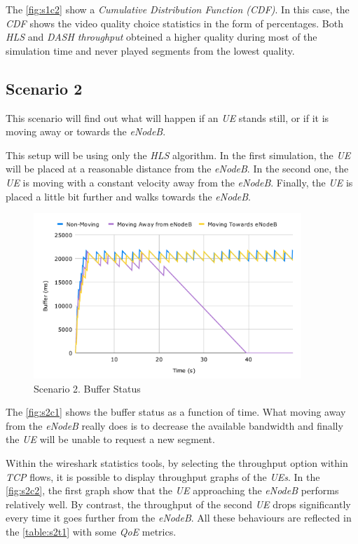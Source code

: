 The \autoref{fig:s1c2} show a \textit{Cumulative Distribution Function (CDF)}. In this 
case, the \textit{CDF} shows the video quality choice statistics in the form of percentages. 
Both \textit{HLS} and \textit{DASH throughput} obteined a higher quality during most of 
the simulation time and never played segments from the lowest quality.

\subsection{Scenario 2}

This scenario will find out what will happen if an \textit{UE} stands still, or if it is moving away
or towards the \textit{eNodeB}.

This setup will be using only the \textit{HLS} algorithm. In the first simulation, the \textit{UE}
will be placed at a reasonable distance from the \textit{eNodeB}. In the second one, the \textit{UE}
is moving with a constant velocity away from the \textit{eNodeB}. Finally, the \textit{UE} is placed 
a little bit further and walks towards the \textit{eNodeB}.

\begin{figure}[h]
    \centering
    \includegraphics[width=0.9\textwidth]{img/s2c1.pdf}
    \caption{Scenario 2. Buffer Status}
    \label{fig:s2c1}
\end{figure}

The \autoref{fig:s2c1} shows the buffer status as a function of time. What moving away from 
the \textit{eNodeB} really does is to decrease the available bandwidth and finally the \textit{UE}
will be unable to request a new segment. 

Within the wireshark statistics tools, by selecting the throughput option within \textit{TCP} flows, 
it is possible to display throughput graphs of the \textit{UEs}. In the \autoref{fig:s2c2}, the first
graph show that the \textit{UE} approaching the \textit{eNodeB} performs relatively well. By contrast,
the throughput of the second \textit{UE} drops significantly every time it goes further from the \textit{eNodeB}.
All these behaviours are reflected in the \autoref{table:s2t1} with some \textit{QoE} metrics.

